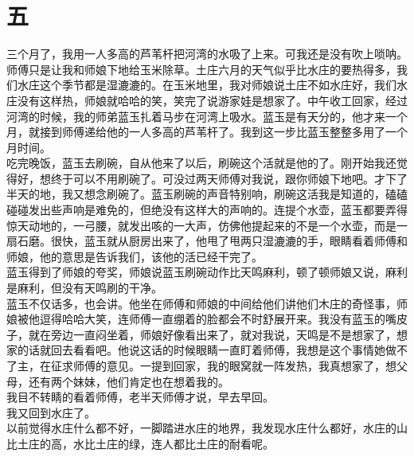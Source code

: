 \fancyhead[RO]{\thepage} %
\fancyhead[LE]{\thepage} %
\fancyfoot[LE,RO]{}
\fancyfoot[LO,CE]{}
\fancyfoot[CO,RE]{}
\chapter*{五}
三个月了，我用一人多高的芦苇杆把河湾的水吸了上来。可我还是没有吹上唢呐。师傅只是让我和师娘下地给玉米除草。土庄六月的天气似乎比水庄的要热得多，我们水庄这个季节都是湿漉漉的。在玉米地里，我对师娘说土庄不如水庄好，我们水庄没有这样热，师娘就哈哈的笑，笑完了说游家娃是想家了。中午收工回家，经过河湾的时候，我的师弟蓝玉扎着马步在河湾上吸水。蓝玉是有天分的，他才来一个月，就接到师傅递给他的一人多高的芦苇杆了。我到这一步比蓝玉整整多用了一个月时间。
\\

吃完晚饭，蓝玉去刷碗，自从他来了以后，刷碗这个活就是他的了。刚开始我还觉得好，想终于可以不用刷碗了。可没过两天师傅对我说，跟你师娘下地吧。才下了半天的地，我又想念刷碗了。蓝玉刷碗的声音特别响，刷碗这活我是知道的，磕磕碰碰发出些声响是难免的，但绝没有这样大的声响的。连提个水壶，蓝玉都要弄得惊天动地的，一弓腰，就发出咳的一大声，仿佛他提起来的不是一个水壶，而是一扇石磨。很快，蓝玉就从厨房出来了，他甩了甩两只湿漉漉的手，眼睛看着师傅和师娘，他的意思是告诉我们，该他的活已经干完了。
\\

蓝玉得到了师娘的夸奖，师娘说蓝玉刷碗动作比天鸣麻利，顿了顿师娘又说，麻利是麻利，但没有天鸣刷的干净。
\\

蓝玉不仅话多，也会讲。他坐在师傅和师娘的中间给他们讲他们木庄的奇怪事，师娘被他逗得哈哈大笑，连师傅一直绷着的脸都会不时舒展开来。我没有蓝玉的嘴皮子，就在旁边一直闷坐着，师娘好像看出来了，就对我说，天鸣是不是想家了，想家的话就回去看看吧。他说这话的时候眼睛一直盯着师傅，我想是这个事情她做不了主，在征求师傅的意见。一提到回家，我的眼窝就一阵发热，我真想家了，想父母，还有两个妹妹，他们肯定也在想着我的。
\\

我目不转睛的看着师傅，老半天师傅才说，早去早回。
\\

我又回到水庄了。
\\

以前觉得水庄什么都不好，一脚踏进水庄的地界，我发现水庄什么都好，水庄的山比土庄的高，水比土庄的绿，连人都比土庄的耐看呢。
\\

